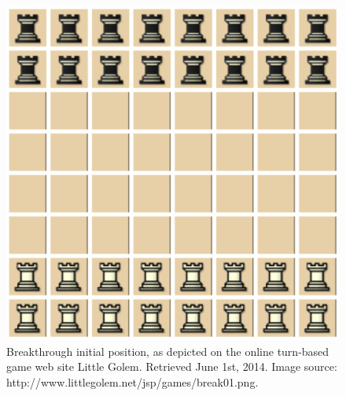 \documentclass{article}
\begin{document}
\begin{figure}[h!]
\begin{center}
\includegraphics[scale=0.4]{images/break01}
\end{center}
\caption{Breakthrough initial position, as depicted on the online turn-based game web site Little Golem. 
Retrieved June 1st, 2014. 
Image source: http://www.littlegolem.net/jsp/games/break01.png. 
\label{fig:bt-image}}
\end{figure}
\end{document}
